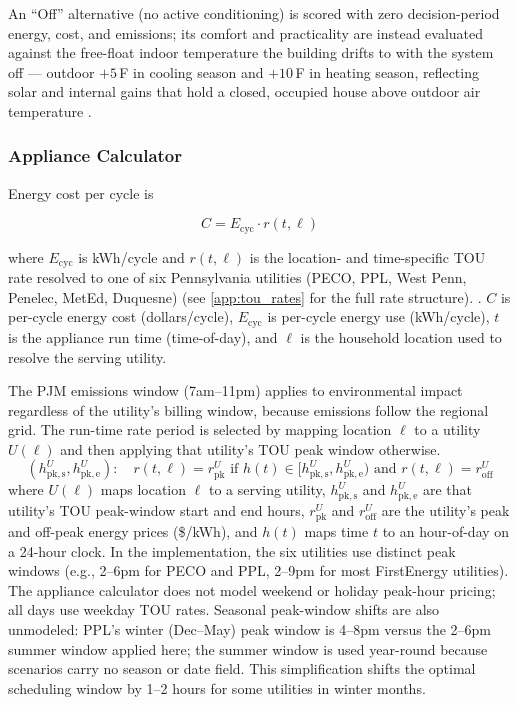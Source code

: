 \documentclass[final,3p,times]{elsarticle}
\begin{document}
An ``Off'' alternative (no active conditioning) is scored with zero decision-period energy, cost, and emissions; its comfort and practicality are instead evaluated against the free-float indoor temperature the building drifts to with the system off --- outdoor $+5$\,\textdegree{}F in cooling season and $+10$\,\textdegree{}F in heating season, reflecting solar and internal gains that hold a closed, occupied house above outdoor air temperature \cite{dedear2002,ashrae55_2020,accamanualj,ashrae_hof2017}.

\subsubsection{Appliance Calculator}
Energy cost per cycle is

\begin{equation}
    C = E_{\mathrm{cyc}} \cdot r(t,\ell)
\end{equation}

where $E_{\mathrm{cyc}}$ is kWh/cycle and $r(t,\ell)$ is the location- and time-specific TOU rate resolved to one of six Pennsylvania utilities (PECO, PPL, West Penn, Penelec, MetEd, Duquesne) \cite{peco2021} (see \ref{app:tou_rates} for the full rate structure).
\noindent. $C$ is per-cycle energy cost (dollars/cycle), $E_{\mathrm{cyc}}$ is per-cycle energy use (kWh/cycle), $t$ is the appliance run time (time-of-day), and $\ell$ is the household location used to resolve the serving utility.

The PJM emissions window (7am--11pm) applies to environmental impact regardless of the utility's billing window, because emissions follow the regional grid.
The run-time rate period is selected by mapping location $\ell$ to a utility $U(\ell)$ and then applying that utility's TOU peak window otherwise.
\begin{equation}
(h^{U}_{\mathrm{pk,s}}, h^{U}_{\mathrm{pk,e}}):
\quad
r(t,\ell)=r^{U}_{\mathrm{pk}}
\text{ if }
h(t)\in[h^{U}_{\mathrm{pk,s}}, h^{U}_{\mathrm{pk,e}})
\text{ and }
r(t,\ell)=r^{U}_{\mathrm{off}}
\end{equation}
\noindent where $U(\ell)$ maps location $\ell$ to a serving utility, $h^{U}_{\mathrm{pk,s}}$ and $h^{U}_{\mathrm{pk,e}}$ are that utility's TOU peak-window start and end hours, $r^{U}_{\mathrm{pk}}$ and $r^{U}_{\mathrm{off}}$ are the utility's peak and off-peak energy prices (\$/kWh), and $h(t)$ maps time $t$ to an hour-of-day on a 24-hour clock.
\noindent In the implementation, the six utilities use distinct peak windows (e.g., 2--6pm for PECO and PPL, 2--9pm for most FirstEnergy utilities). The appliance calculator does not model weekend or holiday peak-hour pricing; all days use weekday TOU rates. Seasonal peak-window shifts are also unmodeled: PPL's winter (Dec--May) peak window is 4--8pm versus the 2--6pm summer window applied here; the summer window is used year-round because scenarios carry no season or date field. This simplification shifts the optimal scheduling window by 1--2 hours for some utilities in winter months.
\end{document}
